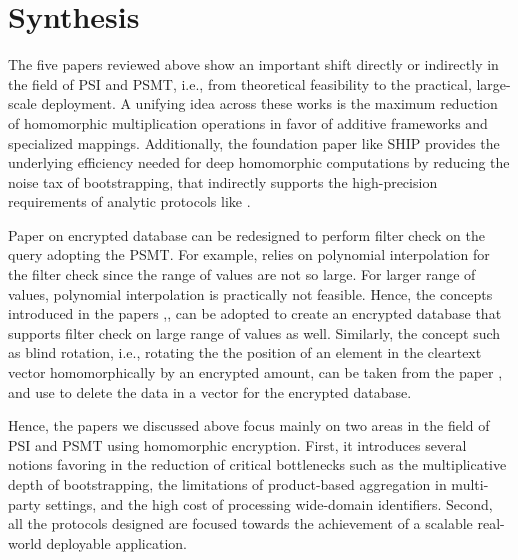 \documentclass[12pt]{article}
\begin{document}
\section{Synthesis}
The five papers reviewed above show an important shift directly or indirectly in the field of PSI and PSMT, i.e., from theoretical feasibility to the practical, large-scale deployment. A unifying idea across these works is the maximum reduction of homomorphic multiplication operations in favor of additive frameworks and specialized mappings. Additionally, the foundation paper like SHIP \cite{cheon2025ship} provides the underlying efficiency needed for deep homomorphic computations by reducing the noise tax of bootstrapping, that indirectly supports the high-precision requirements of analytic protocols like \cite{koirala2025select}.

Paper \cite{blindenbach2024squid} on encrypted database can be redesigned to perform filter check on the query adopting the PSMT. For example, \cite{blindenbach2024squid} relies on polynomial interpolation for the filter check since the range of values are not so large. For larger range of values, polynomial interpolation is practically not feasible. Hence, the concepts introduced in the papers \cite{koirala2025psmt},\cite{koirala2025select},\cite{paik2025scalable} can be adopted to create an encrypted database that supports filter check on large range of values as well. Similarly, the concept such as blind rotation, i.e., rotating the the position of an element in the cleartext vector homomorphically by an encrypted amount, can be taken from the paper \cite{cheon2025ship}, and use to delete the data in a vector for the encrypted database. 

Hence, the papers we discussed above focus mainly on two areas in the field of PSI and PSMT using homomorphic encryption. First, it introduces several notions favoring in the reduction of critical bottlenecks such as the multiplicative depth of bootstrapping, the limitations of product-based aggregation in multi-party settings, and the high cost of processing wide-domain identifiers. Second, all the protocols designed are focused towards the achievement of a scalable real-world deployable application.


\end{document}
